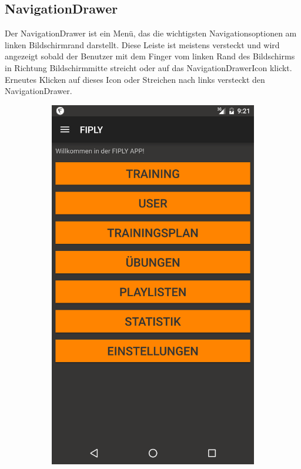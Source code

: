 \documentclass[FIPLY_base.tex]{subfiles}
\begin{document}
\subsection{NavigationDrawer}
Der NavigationDrawer ist ein Menü, das die wichtigsten Navigationsoptionen am linken Bildschirmrand darstellt.
Diese Leiste ist meistens versteckt und wird angezeigt sobald der Benutzer mit dem Finger vom linken Rand des Bildschirms in Richtung Bildschirmmitte streicht oder auf das NavigationDrawerIcon klickt.
Erneutes Klicken auf dieses Icon oder Streichen nach links versteckt den NavigationDrawer. 
\ \\
\begin{figure}[h]
	\begin{subfigure}[b]{0.3\textwidth}
	\includegraphics[scale=0.15]{img/NavDrawerClosed}

\end{subfigure}
\end{figure}
\end{document}
